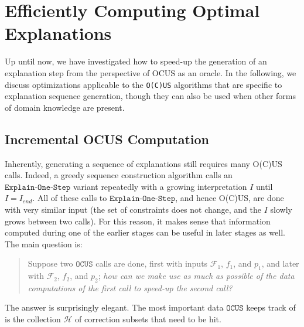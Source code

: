 \documentclass[twoside,11pt]{article}
\newcommand\m[1]{\mathcal{#1}}
\newcommand\comment[1]{\marginpar{\tiny #1}}
\renewcommand\comment[1]{#1}
\newcommand{\emilio}[1]{{\comment{\color{red}Emilio: #1}}}
\newcommand{\bart}[1]{{\comment{\color{OliveGreen}Bart: #1}}}
\newcommand\setstohit{\ensuremath{\m{H} }\xspace}
\newcommand\Iend{\ensuremath{I_\mathit{end} }\xspace}
\newcommand\formula{\ensuremath{\m{F} }\xspace}
\newcommand\mm[1]{\ensuremath{#1}\xspace}
\newcommand\call[1]{\mm{\texttt{#1}}}
\newcommand\comus{\mm{\call{OCUS}}}
\newcommand\onestep{\ensuremath{\call{Explain-One-Step}}\xspace}
\begin{document}
\section{Efficiently Computing Optimal Explanations}\label{sec:efficient-ocus}
%
%

	Up until now, we have investigated how to speed-up the generation of an explanation step from the perspective of OCUS as an oracle.
	In the following, we discuss optimizations applicable to the \texttt{O(C)US} algorithms that are specific to explanation sequence generation, though they can also be used when other forms of domain knowledge are present. 

\subsection{Incremental OCUS Computation}\label{sec:ocusEx}
Inherently, generating a sequence of explanations still requires many O(C)US calls. 
Indeed, a greedy sequence construction algorithm %
calls an \onestep variant repeatedly with a growing interpretation $I$ until $I=\Iend$.
%
All of these calls to \onestep, and hence O(C)US, are done with very similar input (the set of constraints does not change, and the $I$ slowly grows between two calls). For this reason, it makes sense that information computed during one of the earlier stages can be useful in later stages as well. 
The main question is: 
\begin{quote}
	Suppose two \comus calls are done, first with inputs $\formula_1$, $f_1$, and $p_1$, and later with $\formula_2$, $f_2$, and $p_2$; \emph{how can we make use as much as possible of the data computations of the first call to speed-up the second call?}
\end{quote}
 The answer is surprisingly elegant. The most important data \comus keeps track of is the collection \setstohit of correction subsets that need to be hit.
\end{document}
